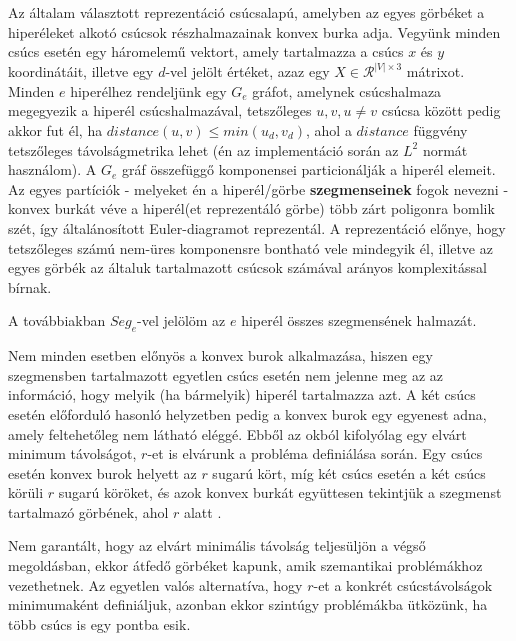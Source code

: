 Az általam választott reprezentáció csúcsalapú, amelyben az egyes görbéket a hiperéleket alkotó csúcsok részhalmazainak konvex burka adja. Vegyünk minden csúcs esetén egy háromelemű vektort, amely tartalmazza a csúcs $x$ és $y$ koordinátáit, illetve egy $d$-vel jelölt értéket, azaz egy $X \in \mathcal{R}^{|V| \times 3}$ mátrixot. Minden $e$ hiperélhez rendeljünk egy $G_e$ gráfot, amelynek csúcshalmaza megegyezik a hiperél csúcshalmazával, tetszőleges $u, v, u \neq v$ csúcsa között pedig akkor fut él, ha $distance(u, v) \leq min(u_d, v_d)$, ahol a $distance$ függvény tetszőleges távolságmetrika lehet (én az implementáció során az $L^2$ normát használom). A $G_e$ gráf összefüggő komponensei particionálják a hiperél elemeit. Az egyes partíciók - melyeket én a hiperél/görbe \textbf{szegmenseinek} fogok nevezni - konvex burkát véve a hiperél(et reprezentáló görbe) több zárt poligonra bomlik szét, így általánosított Euler-diagramot reprezentál. A reprezentáció előnye, hogy tetszőleges számú nem-üres komponensre bontható vele mindegyik él, illetve az egyes görbék az általuk tartalmazott csúcsok számával arányos komplexitással bírnak.

\begin{note}
A továbbiakban $Seg_{e}$-vel jelölöm az $e$ hiperél összes szegmensének halmazát.
\end{note}

Nem minden esetben előnyös a konvex burok alkalmazása, hiszen egy szegmensben tartalmazott egyetlen csúcs esetén nem jelenne meg az az információ, hogy melyik (ha bármelyik) hiperél tartalmazza azt. A két csúcs esetén előforduló hasonló helyzetben pedig a konvex burok egy egyenest adna, amely feltehetőleg nem látható eléggé. Ebből az okból kifolyólag egy elvárt minimum távolságot, $r$-et is elvárunk a probléma definiálása során. Egy csúcs esetén konvex burok helyett az $r$ sugarú kört, míg két csúcs esetén a két csúcs körüli $r$ sugarú köröket, és azok konvex burkát együttesen tekintjük a szegmenst tartalmazó görbének, ahol $r$ alatt .

\begin{note}
Nem garantált, hogy az elvárt minimális távolság teljesüljön a végső megoldásban, ekkor átfedő görbéket kapunk, amik szemantikai problémákhoz vezethetnek. Az egyetlen valós alternatíva, hogy $r$-et a konkrét csúcstávolságok minimumaként definiáljuk, azonban ekkor szintúgy problémákba ütközünk, ha több csúcs is egy pontba esik.
\end{note}

